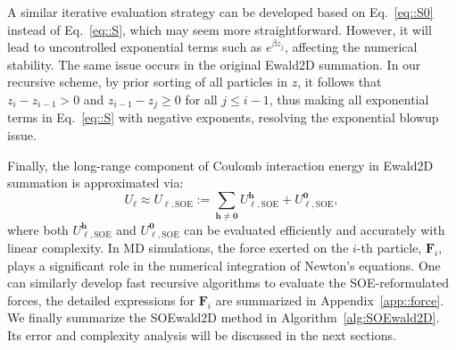 \begin{rmk}
	A similar iterative evaluation strategy can be developed based on Eq.~\eqref{eq::S0} instead of Eq.~\eqref{eq::S}, which may seem more straightforward.
	However, it will lead to uncontrolled exponential terms such as $e^{\beta z_{j}}$, affecting the numerical stability.
	The same issue occurs in the original Ewald2D summation.
	In our recursive scheme, by prior sorting of all particles in $z$, it follows that  $z_{i}-z_{i-1} > 0$ and $z_{i-1} - z_{j} \geq 0$ for all $j \leq i - 1$, thus making all exponential terms in Eq.~\eqref{eq::S} with negative exponents, resolving the exponential blowup issue.
	\label{rmk::stable}
\end{rmk}



Finally, the long-range component of Coulomb interaction energy in Ewald2D summation is approximated via:
\begin{equation}\label{eq:U_l_SOE}
	U_{\ell}\approx U_{\ell,\text{SOE}} := \sum_{\bm{h}\neq \bm{0}} U_{\ell,\text{SOE}}^{\bm{h}}+U_{\ell,\text{SOE}}^{\bm{0}},
\end{equation}
where both $U_{\ell,\text{SOE}}^{\bm{h}}$ and $U_{\ell,\text{SOE}}^{\bm{0}}$ can be evaluated efficiently and accurately with linear complexity.
In MD simulations, the force exerted on the $i$-th particle, $\bm{F}_{i}$, plays a significant role in the numerical integration of Newton's equations.
One can similarly develop fast recursive algorithms to evaluate the SOE-reformulated forces,
the detailed expressions for $\bm{F}_{i}$ are summarized in Appendix~\ref{app::force}.
We finally summarize the SOEwald2D method in Algorithm~\ref{alg:SOEwald2D}. Its error and complexity analysis will be discussed in the next sections.

